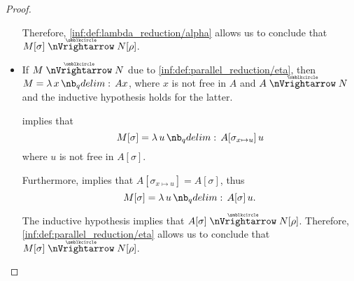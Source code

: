 \begin{proof}
\begin{itemize}
    Therefore, \ref{inf:def:lambda_reduction/alpha} allows us to conclude that \( M[\sigma] \ppred N[\rho] \).

    \item If \( M \ppred N \) due to \ref{inf:def:parallel_reduction/eta}, then \( M = \qabs x Ax \), where \( x \) is not free in \( A \) and \( A \ppred N \) and the inductive hypothesis holds for the latter.

     implies that
    \begin{equation*}
      M[\sigma] = \qabs u A[\sigma_{x \mapsto u}] \thinspace u
    \end{equation*}
    where \( u \) is not free in \( A[\sigma] \).

    Furthermore,  implies that \( A[\sigma_{x \mapsto u}] = A[\sigma] \), thus
    \begin{equation*}
      M[\sigma] = \qabs u A[\sigma] \thinspace u.
    \end{equation*}

    The inductive hypothesis implies that \( A[\sigma] \ppred N[\rho] \). Therefore, \ref{inf:def:parallel_reduction/eta} allows us to conclude that \( M[\sigma] \ppred N[\rho] \).
  \end{itemize}
\end{proof}

